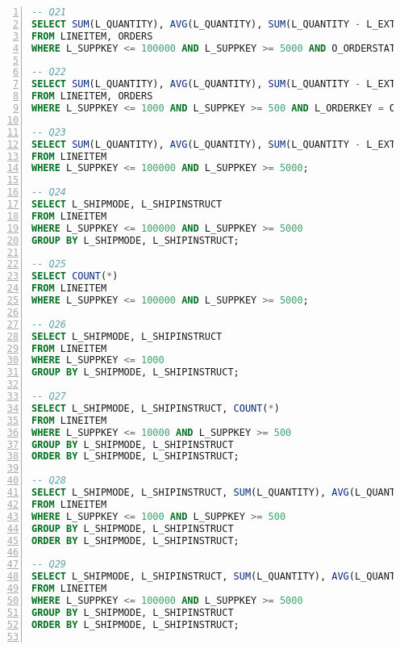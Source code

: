 \begin{lstlisting}[language=sql,numbers=left,xleftmargin=2em,multicols=2,basicstyle=\ttfamily\tiny]
-- Q21
SELECT SUM(L_QUANTITY), AVG(L_QUANTITY), SUM(L_QUANTITY - L_EXTENDEDPRICE), SUM(L_QUANTITY * L_EXTENDEDPRICE - 1), AVG(L_DISCOUNT * (L_TAX +1)), AVG(L_QUANTITY / (L_TAX +1)), SUM(O_TOTALPRICE), AVG(O_SHIPPRIORITY), SUM(O_TOTALPRICE - L_EXTENDEDPRICE), AVG(O_SHIPPRIORITY * L_EXTENDEDPRICE - 1), COUNT(*)
FROM LINEITEM, ORDERS
WHERE L_SUPPKEY <= 100000 AND L_SUPPKEY >= 5000 AND O_ORDERSTATUS = 'F' AND L_ORDERKEY = O_ORDERKEY;

-- Q22
SELECT SUM(L_QUANTITY), AVG(L_QUANTITY), SUM(L_QUANTITY - L_EXTENDEDPRICE), SUM(L_QUANTITY * L_EXTENDEDPRICE - 1), AVG(L_DISCOUNT * (L_TAX +1)), AVG(L_QUANTITY / (L_TAX +1)), SUM(L_TAX)/SUM(L_EXTENDEDPRICE), SUM(L_QUANTITY * 0.5), AVG(L_QUANTITY * 0.2), SUM(O_TOTALPRICE), AVG(O_SHIPPRIORITY), SUM(O_TOTALPRICE - L_EXTENDEDPRICE), AVG(O_SHIPPRIORITY * L_EXTENDEDPRICE - 1), SUM(O_SHIPPRIORITY)/SUM(O_TOTALPRICE), COUNT(*)
FROM LINEITEM, ORDERS
WHERE L_SUPPKEY <= 1000 AND L_SUPPKEY >= 500 AND L_ORDERKEY = O_ORDERKEY;

-- Q23
SELECT SUM(L_QUANTITY), AVG(L_QUANTITY), SUM(L_QUANTITY - L_EXTENDEDPRICE), SUM(L_QUANTITY * L_EXTENDEDPRICE - 1), AVG(L_DISCOUNT * (L_TAX +1)), AVG(L_QUANTITY / (L_TAX +1)), SUM(L_TAX)/SUM(L_EXTENDEDPRICE), SUM(L_QUANTITY * 0.5), AVG(L_QUANTITY * 0.2), COUNT(*)
FROM LINEITEM
WHERE L_SUPPKEY <= 100000 AND L_SUPPKEY >= 5000;

-- Q24
SELECT L_SHIPMODE, L_SHIPINSTRUCT
FROM LINEITEM
WHERE L_SUPPKEY <= 100000 AND L_SUPPKEY >= 5000
GROUP BY L_SHIPMODE, L_SHIPINSTRUCT;

-- Q25
SELECT COUNT(*)
FROM LINEITEM
WHERE L_SUPPKEY <= 100000 AND L_SUPPKEY >= 5000;

-- Q26
SELECT L_SHIPMODE, L_SHIPINSTRUCT
FROM LINEITEM
WHERE L_SUPPKEY <= 1000
GROUP BY L_SHIPMODE, L_SHIPINSTRUCT;

-- Q27
SELECT L_SHIPMODE, L_SHIPINSTRUCT, COUNT(*)
FROM LINEITEM
WHERE L_SUPPKEY <= 10000 AND L_SUPPKEY >= 500
GROUP BY L_SHIPMODE, L_SHIPINSTRUCT
ORDER BY L_SHIPMODE, L_SHIPINSTRUCT;

-- Q28
SELECT L_SHIPMODE, L_SHIPINSTRUCT, SUM(L_QUANTITY), AVG(L_QUANTITY), COUNT(*)
FROM LINEITEM
WHERE L_SUPPKEY <= 1000 AND L_SUPPKEY >= 500
GROUP BY L_SHIPMODE, L_SHIPINSTRUCT
ORDER BY L_SHIPMODE, L_SHIPINSTRUCT;

-- Q29
SELECT L_SHIPMODE, L_SHIPINSTRUCT, SUM(L_QUANTITY), AVG(L_QUANTITY), COUNT(*)
FROM LINEITEM
WHERE L_SUPPKEY <= 100000 AND L_SUPPKEY >= 5000
GROUP BY L_SHIPMODE, L_SHIPINSTRUCT
ORDER BY L_SHIPMODE, L_SHIPINSTRUCT;


\end{lstlisting}
